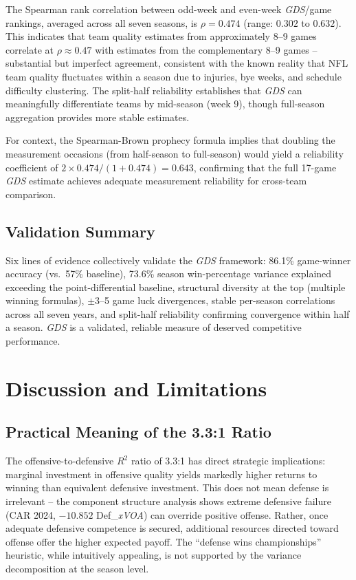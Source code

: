 \documentclass[12pt,a4paper]{article}
\newcommand{\xvoa}{\textit{xVOA}}
\newcommand{\gds}{\textit{GDS}}
\begin{document}
The Spearman rank correlation between odd-week and even-week \gds{}/game rankings, averaged across all seven seasons, is $\rho = 0.474$ (range: $0.302$ to $0.632$). This indicates that team quality estimates from approximately 8--9 games correlate at $\rho \approx 0.47$ with estimates from the complementary 8--9 games -- substantial but imperfect agreement, consistent with the known reality that NFL team quality fluctuates within a season due to injuries, bye weeks, and schedule difficulty clustering. The split-half reliability establishes that \gds{} can meaningfully differentiate teams by mid-season (week 9), though full-season aggregation provides more stable estimates.

For context, the Spearman-Brown prophecy formula implies that doubling the measurement occasions (from half-season to full-season) would yield a reliability coefficient of $2 \times 0.474 / (1 + 0.474) = 0.643$, confirming that the full 17-game \gds{} estimate achieves adequate measurement reliability for cross-team comparison.

\subsection{Validation Summary}

Six lines of evidence collectively validate the \gds{} framework: 86.1\% game-winner accuracy (vs.\ 57\% baseline), 73.6\% season win-percentage variance explained exceeding the point-differential baseline, structural diversity at the top (multiple winning formulas), $\pm$3--5 game luck divergences, stable per-season correlations across all seven years, and split-half reliability confirming convergence within half a season. \gds{} is a validated, reliable measure of deserved competitive performance.

\section{Discussion and Limitations}
\label{sec:discussion}

\subsection{Practical Meaning of the 3.3:1 Ratio}

The offensive-to-defensive $R^2$ ratio of 3.3:1 has direct strategic implications: marginal investment in offensive quality yields markedly higher returns to winning than equivalent defensive investment. This does not mean defense is irrelevant -- the component structure analysis shows extreme defensive failure (CAR 2024, $-10.852$ Def\_\xvoa{}) can override positive offense. Rather, once adequate defensive competence is secured, additional resources directed toward offense offer the higher expected payoff. The ``defense wins championships'' heuristic, while intuitively appealing, is not supported by the variance decomposition at the season level.
\end{document}
